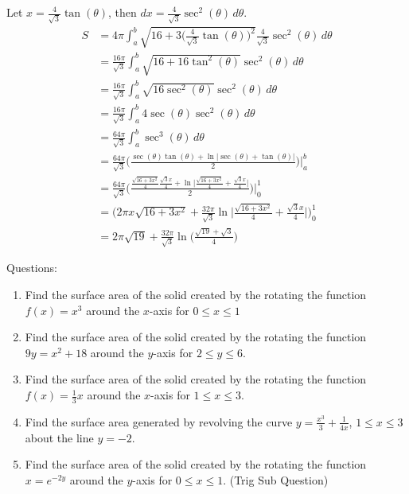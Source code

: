 \documentclass[16pt]{article}
\theoremstyle{remark}
\begin{document}
\begin{enumerate}
\begin{mdframed}[style=TheoremFrame]
Let $\displaystyle{x=\frac{4}{\sqrt{3}} \tan(\theta)}$, then $\displaystyle{dx = \frac{4}{\sqrt{3}} \sec^2(\theta)\,d\theta}$.
\begin{align*}
S&= 4\pi \int_a^b \sqrt{16+3\bigg(\frac{4}{\sqrt{3}}\tan(\theta)\bigg)^2}\frac{4}{\sqrt{3}} \sec^2(\theta)\, d\theta\\
&= \frac{16\pi}{\sqrt{3}} \int_a^b \sqrt{16+16\tan^2(\theta)} \sec^2(\theta) \, d\theta\\
&= \frac{16\pi}{\sqrt{3}} \int_a^b \sqrt{16\sec^2(\theta)} \sec^2(\theta) \, d\theta\\
&= \frac{16\pi}{\sqrt{3}} \int_a^b 4\sec(\theta) \sec^2(\theta) \, d\theta\\
&= \frac{64\pi}{\sqrt{3}}\int_a^b  \sec^3(\theta) \, d\theta\\
&= \frac{64\pi}{\sqrt{3}} \bigg(\frac{\sec(\theta)\tan(\theta) + \ln\big|\sec(\theta)+\tan(\theta)\big|}{2}\bigg) \bigg|_a^b\\
&= \frac{64\pi}{\sqrt{3}} \bigg(\frac{\frac{\sqrt{16+3x^2}}{4}\frac{\sqrt{3}x}{4} + \ln\big|\frac{\sqrt{16+3x^2}}{4}+\frac{\sqrt{3}x}{4}\big|}{2}\bigg) \bigg|_0^1\\
&= \bigg(2\pi x \sqrt{16+3x^2} + \frac{32\pi}{\sqrt{3}} \ln\big|\frac{\sqrt{16+3x^2}}{4}+\frac{\sqrt{3}x}{4}\big|\bigg)_0^1\\
&= 2\pi \sqrt{19} + \frac{32\pi}{\sqrt{3}} \ln\bigg(\frac{\sqrt{19}+\sqrt{3}}{4}\bigg) 
\end{align*}
\end{mdframed}
\end{enumerate}
\newpage
Questions:
\begin{enumerate}

\item Find the surface area of the solid created by the rotating the function $f(x) = x^3$ around the $x$-axis for $0 \leq x \leq 1$
\newpage
\item Find the surface area of the solid created by the rotating the function $9y = x^2+18$ around the $y$-axis for $2 \leq y \leq 6$.
\newpage
\item Find the surface area of the solid created by the rotating the function $f(x) = \frac{1}{3}x$ around the $x$-axis for $1 \leq x \leq 3$.
\newpage
\item Find the surface area generated by revolving the curve $y=\frac{x^3}{3}+\frac{1}{4x}$, $1\leq x \leq 3$ about the line $y=-2$.
\newpage
\item Find the surface area of the solid created by the rotating the function $x = e^{-2y}$ around the $y$-axis for $0 \leq x \leq 1$. (Trig Sub Question)
\newpage
\end{enumerate}
\end{document}
